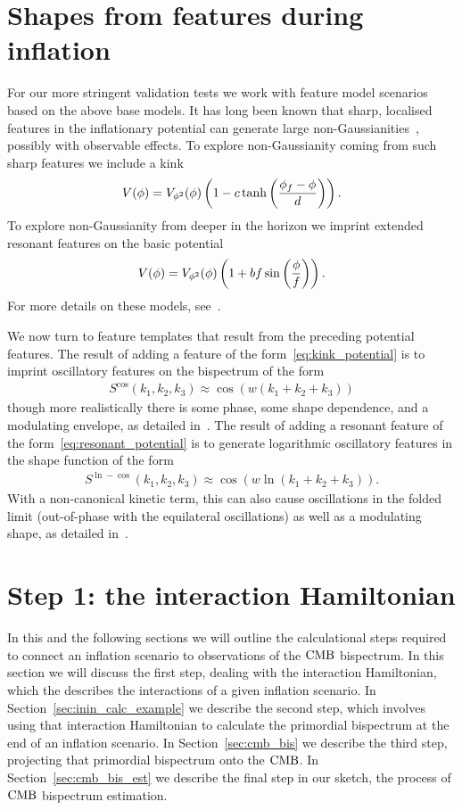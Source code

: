 \section{Shapes from features during inflation}
For our more stringent validation tests we work with feature model scenarios
based on the above base models.
It has long been known that sharp, localised features in the inflationary potential
can generate large non-Gaussianities~\cite{chen_easther_lim_1}, possibly with observable effects.
To explore non-Gaussianity coming from such sharp features we include
a kink~\cite{Adams_step}
\begin{align}\label{eq:kink_potential}
    V(\phi) = V_{\phi^2}(\phi)\left(1-c\tanh\left(\frac{\phi_f-\phi}{d}\right)\right).
\end{align}
To explore non-Gaussianity from deeper in the horizon we imprint
extended resonant features on the basic potential
\begin{align}\label{eq:resonant_potential}
    V(\phi) = V_{\phi^2}(\phi)\left(1+bf\sin\left(\frac{\phi}{f}\right)\right).
\end{align}
For more details on these models, see~\cite{chen_easther_lim_2}.


We now turn to feature templates that result from the preceding potential features.
The result of adding a feature of the form~\eqref{eq:kink_potential}
is to imprint oscillatory features on the bispectrum of the form
\begin{align}\label{cos_shape}
    S^{\cos}(k_1,k_2,k_3) \approx \cos(w(k_1+k_2+k_3))
\end{align}
though more realistically there is some phase, some shape dependence, and a modulating envelope,
as detailed in~\cite{adshead}.
The result of adding a resonant feature of the form~\eqref{eq:resonant_potential}
is to generate logarithmic oscillatory features in the shape function of the form
\begin{align}\label{ln_cos_shape}
    S^{\ln-\cos}(k_1,k_2,k_3) \approx \cos(w\ln(k_1+k_2+k_3)).
\end{align}
With a non-canonical kinetic term, this can also
cause oscillations in the folded limit (out-of-phase
with the equilateral oscillations) as well as a modulating shape,
as detailed in~\cite{chen_folded_resonant}.


    \section{Step 1: the interaction Hamiltonian}\label{sec:int_ham}
    In this and the following sections we will outline the calculational steps required to connect
    an inflation scenario to observations of the $\text{CMB}$ bispectrum.
    In this section we will discuss the first step,
    dealing with the interaction Hamiltonian,
    which the describes the interactions of a given inflation scenario.
    In Section~\ref{sec:inin_calc_example} we describe the second step,
    which involves using that interaction Hamiltonian to 
    calculate the primordial bispectrum at the end of an inflation scenario.
    In Section~\ref{sec:cmb_bis} we describe the third step,
    projecting that primordial bispectrum onto the $\text{CMB}$. In Section~\ref{sec:cmb_bis_est} we describe the final
    step in our sketch, the process of $\text{CMB}$ bispectrum estimation.
